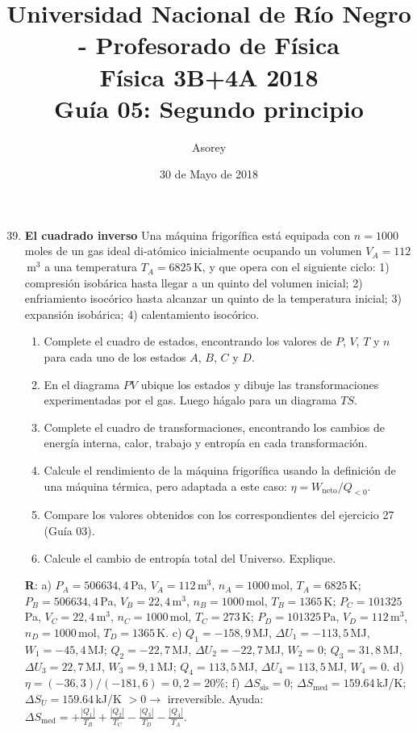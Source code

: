 \documentclass[a4paper,12pt]{article}
\begin{document}
\title{
{\normalsize{Universidad Nacional de Río Negro - Profesorado de Física}}\\
Física 3B+4A  2018 \\ Guía 05: Segundo principio
}
\author{Asorey}
\date{30 de Mayo de 2018} 
\maketitle

\begin{enumerate}
	\setcounter{enumi}{38}      %
    \item {\bf{El cuadrado inverso}}
		Una máquina frigorífica está equipada con $n=1000$\,moles de un gas
		ideal di-atómico inicialmente ocupando un volumen $V_A=112$\,m$^3$ a una
		temperatura $T_A=6825$\,K, y que opera con el siguiente ciclo: 1)
		compresión isobárica hasta llegar a un quinto del volumen inicial; 2) enfriamiento isocórico hasta alcanzar un quinto de la temperatura inicial; 3) expansión isobárica; 4) calentamiento isocórico.
        \begin{enumerate}
            \item Complete el cuadro de estados, encontrando los valores de
                $P$, $V$, $T$ y $n$ para cada uno de los estados $A$, $B$, $C$
                y $D$.
            \item En el diagrama $PV$ ubique los estados y dibuje las
				transformaciones experimentadas por el gas. Luego hágalo para
				un diagrama $TS$.
            \item Complete el cuadro de transformaciones, encontrando los
                cambios de energía interna, calor, trabajo y entropía en cada
                transformación.
			\item Calcule el rendimiento de la máquina frigorífica usando la
				definición de una máquina térmica, pero adaptada a este caso:
				$\eta=W_{\mathrm{neto}}/Q_{<0}$.
			\item Compare los valores obtenidos con los correspondientes del
				ejercicio 27 (Guía 03).
			\item Calcule el cambio de entropía total del Universo. Explique.
        \end{enumerate}
        {\bf{R}}: a) 
		$P_A=506634,4$\,Pa, $V_A=112$\,m$^3$, $n_A=1000$\,mol, $T_A=6825$\,K; 
		$P_B=506634,4$\,Pa, $V_B=22,4$\,m$^3$, $n_B=1000$\,mol, $T_B=1365$\,K; 
		$P_C=101325$\,Pa, $V_C=22,4$\,m$^3$, $n_C=1000$\,mol, $T_C=273$\,K; 
		$P_D=101325$\,Pa, $V_D=112$\,m$^3$, $n_D=1000$\,mol, $T_D=1365$\,K. 
		c) 
		$Q_1=-158,9$\,MJ, $\Delta U_1=-113,5$\,MJ, $W_1=-45,4$\,MJ;
		$Q_2=-22,7$\,MJ, $\Delta U_2=-22,7$\,MJ, $W_2=0$;
		$Q_3=31,8$\,MJ, $\Delta U_3=22,7$\,MJ, $W_3=9,1$\,MJ; 
        $Q_4=113,5$\,MJ, $\Delta U_4=113,5$\,MJ, $W_4=0$. 
		d) $\eta=(-36,3)/(-181,6) = 0,2 = 20\%$;
		f) $\Delta S_{\mathrm{sis}} = 0$; $\Delta
		S_{\mathrm{med}}=159.64$\,kJ/K; $\Delta S_U=159.64$\,kJ/K $>0 \to$
		irreversible. Ayuda: $\Delta S_{\mathrm{med}} = +\frac{|Q_1|}{T_B} +
		\frac{|Q_2|}{T_C} - \frac{|Q_3|}{T_D} - \frac{|Q_4|}{T_A}$.
	

\end{enumerate}
\end{document}
